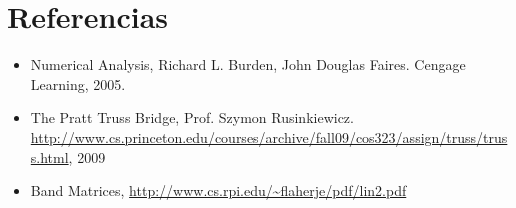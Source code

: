 \section{Referencias}

\begin{itemize}
    \item Numerical Analysis, Richard L. Burden, John Douglas Faires. Cengage Learning, 2005.
    \item The Pratt Truss Bridge, Prof. Szymon Rusinkiewicz. \url{http://www.cs.princeton.edu/courses/archive/fall09/cos323/assign/truss/truss.html}, 2009
    \item Band Matrices, \url{http://www.cs.rpi.edu/~flaherje/pdf/lin2.pdf}
\end{itemize}